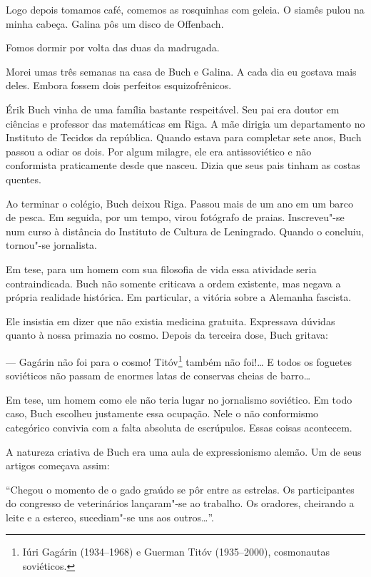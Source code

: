 Logo depois tomamos café, comemos as rosquinhas com geleia. O siamês
pulou na minha cabeça. Galina pôs um disco de Offenbach.

Fomos dormir por volta das duas da madrugada.

\bigskip

Morei umas três semanas na casa de Buch e Galina. A cada dia eu gostava
mais deles. Embora fossem dois perfeitos esquizofrênicos.

Érik Buch vinha de uma família bastante respeitável. Seu pai era doutor
em ciências e professor das matemáticas em Riga. A mãe dirigia um
departamento no Instituto de Tecidos da república. Quando estava para
completar sete anos, Buch passou a odiar os dois. Por algum milagre, ele
era antissoviético e não conformista praticamente desde que nasceu.
Dizia que seus pais tinham as costas quentes.

Ao terminar o colégio, Buch deixou Riga. Passou mais de um ano em um
barco de pesca. Em seguida, por um tempo, virou fotógrafo de praias.
Inscreveu"-se num curso à distância do Instituto de Cultura de
Leningrado. Quando o concluiu, tornou"-se jornalista.

Em tese, para um homem com sua filosofia de vida essa atividade seria
contraindicada. Buch não somente criticava a ordem existente, mas negava
a própria realidade histórica. Em particular, a vitória sobre a Alemanha
fascista.

Ele insistia em dizer que não existia medicina gratuita. Expressava
dúvidas quanto à nossa primazia no cosmo. Depois da terceira dose, Buch
gritava:

--- Gagárin não foi para o cosmo! Titóv\footnote{Iúri Gagárin
  (1934--1968) e Guerman Titóv (1935--2000), cosmonautas soviéticos.}
também não foi!\ldots{} E todos os foguetes soviéticos não passam de enormes
latas de conservas cheias de barro\ldots{}

Em tese, um homem como ele não teria lugar no jornalismo soviético. Em
todo caso, Buch escolheu justamente essa ocupação. Nele o não
conformismo categórico convivia com a falta absoluta de escrúpulos.
Essas coisas acontecem.

A natureza criativa de Buch era uma aula de expressionismo alemão. Um de
seus artigos começava assim:

``Chegou o momento de o gado graúdo se pôr entre as estrelas. Os
participantes do congresso de veterinários lançaram"-se ao trabalho. Os
oradores, cheirando a leite e a esterco, sucediam"-se uns aos
outros\ldots{}''.

